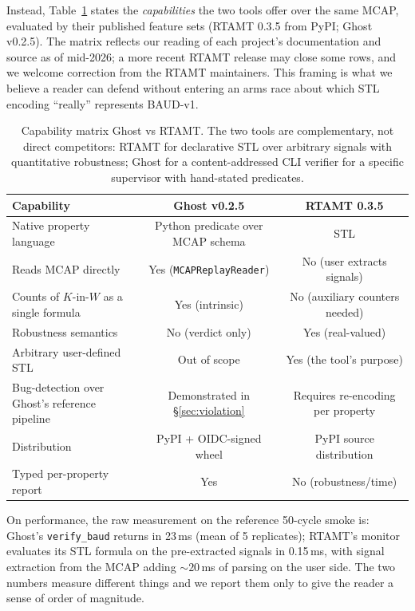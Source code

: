 \documentclass[11pt,a4paper]{article}
\begin{document}
Instead, Table~\ref{tab:rtamt-bench} states the \emph{capabilities}
the two tools offer over the same MCAP, evaluated by their
published feature sets (RTAMT 0.3.5 from PyPI; Ghost v0.2.5). The
matrix reflects our reading of each project's documentation and
source as of mid-2026; a more recent RTAMT release may close some
rows, and we welcome correction from the RTAMT maintainers. This
framing is what we believe a reader can defend without entering an
arms race about which STL encoding ``really'' represents BAUD-v1.

\begin{table}[h]
\centering
\footnotesize
\begin{tabular}{lcc}
\toprule
\textbf{Capability} & \textbf{Ghost v0.2.5} & \textbf{RTAMT 0.3.5} \\
\midrule
Native property language                              & Python predicate over MCAP schema & STL \\
Reads MCAP directly                                   & Yes (\texttt{MCAPReplayReader})   & No (user extracts signals) \\
Counts of $K$-in-$W$ as a single formula              & Yes (intrinsic)                   & No (auxiliary counters needed) \\
Robustness semantics                                  & No (verdict only)                 & Yes (real-valued) \\
Arbitrary user-defined STL                            & Out of scope                      & Yes (the tool's purpose) \\
Bug-detection over Ghost's reference pipeline         & Demonstrated in \S\ref{sec:violation}  & Requires re-encoding per property \\
Distribution                                          & PyPI + OIDC-signed wheel          & PyPI source distribution \\
Typed per-property report                             & Yes                               & No (robustness/time) \\
\bottomrule
\end{tabular}
\caption{Capability matrix Ghost vs RTAMT. The two tools are
complementary, not direct competitors: RTAMT for declarative STL
over arbitrary signals with quantitative robustness; Ghost for a
content-addressed CLI verifier for a specific supervisor with
hand-stated predicates.}
\label{tab:rtamt-bench}
\end{table}

On performance, the raw measurement on the reference 50-cycle smoke
is: Ghost's \texttt{verify\_baud} returns in 23\,ms (mean of 5
replicates); RTAMT's monitor evaluates its STL formula on the
pre-extracted signals in 0.15\,ms, with signal extraction from the
MCAP adding ${\sim}20$\,ms of parsing on the user side. The two
numbers measure different things and we report them only to give
the reader a sense of order of magnitude.
\end{document}
